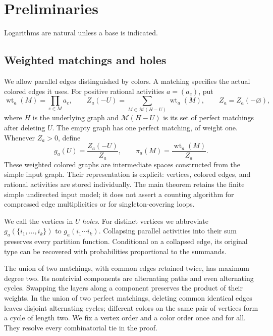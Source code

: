 \documentclass[11pt]{article}
\theoremstyle{definition}
\theoremstyle{remark}
\newcommand{\calM}{\mathcal M}
\newcommand{\wt}{\operatorname{wt}}
\numberwithin{equation}{section}
\begin{document}
\section{Preliminaries}
\label{sec:preliminaries}

Logarithms are natural unless a base is indicated.

\subsection{Weighted matchings and holes}
We allow parallel edges distinguished by colors. A matching specifies
the actual colored edges it uses. For positive rational activities
$a=(a_e)$, put
\[
 \wt_a(M)=\prod_{e\in M}a_e,\qquad
 Z_a(-U)=\sum_{M\in\calM(H-U)}\wt_a(M),
 \qquad Z_a=Z_a(-\varnothing),
\]
where $H$ is the underlying graph and $\calM(H-U)$ is its set of perfect
matchings after deleting $U$. The empty graph has one perfect matching,
of weight one. Whenever $Z_a>0$, define
\[
 g_a(U)=\frac{Z_a(-U)}{Z_a},\qquad
 \pi_a(M)=\frac{\wt_a(M)}{Z_a}.
\]
These weighted colored graphs are intermediate spaces constructed from
the simple input graph. Their representation is explicit: vertices,
colored edges, and rational activities are stored individually. The
main theorem retains the finite simple undirected input model; it does
not assert a counting algorithm for compressed edge multiplicities or
for singleton-covering loops.

We call the vertices in $U$ \emph{holes}. For distinct vertices we abbreviate
$g_a(\{i_1,\ldots,i_k\})$ to $g_a(i_1\cdots i_k)$.
Collapsing parallel activities into their
sum preserves every partition function. Conditional on a collapsed
edge, its original type can be recovered with probabilities
proportional to the summands.

The union of two matchings, with common edges retained twice, has
maximum degree two. Its nontrivial components are alternating paths
and even alternating cycles. Swapping the layers along a component
preserves the product of their weights. In the union of two perfect
matchings, deleting common identical edges leaves disjoint alternating
cycles; different colors on the same pair of vertices form a cycle
of length two. We fix a vertex order and a color order once and for
all. They resolve every combinatorial tie in the proof.
\end{document}
